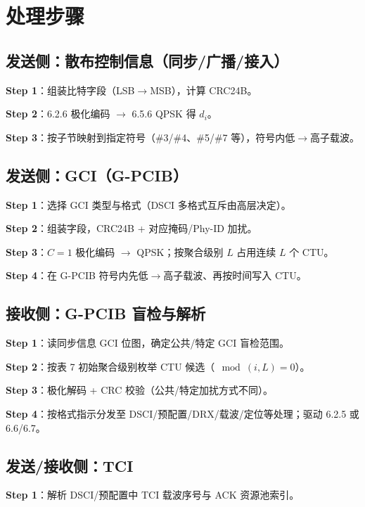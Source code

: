 \documentclass[11pt,a4paper]{ctexart}
\begin{document}
\section{处理步骤}

\subsection{发送侧：散布控制信息（同步/广播/接入）}

\textbf{Step 1}：组装比特字段（LSB$\rightarrow$MSB），计算 CRC24B。

\textbf{Step 2}：6.2.6 极化编码 $\rightarrow$ 6.5.6 QPSK 得 $d_i$。

\textbf{Step 3}：按子节映射到指定符号（\#3/\#4、\#5/\#7 等），符号内低$\rightarrow$高子载波。

\subsection{发送侧：GCI（G-PCIB）}

\textbf{Step 1}：选择 GCI 类型与格式（DSCI 多格式互斥由高层决定）。

\textbf{Step 2}：组装字段，CRC24B + 对应掩码/Phy-ID 加扰。

\textbf{Step 3}：$C{=}1$ 极化编码 $\rightarrow$ QPSK；按聚合级别 $L$ 占用连续 $L$ 个 CTU。

\textbf{Step 4}：在 G-PCIB 符号内先低$\rightarrow$高子载波、再按时间写入 CTU。

\subsection{接收侧：G-PCIB 盲检与解析}

\textbf{Step 1}：读同步信息 GCI 位图，确定公共/特定 GCI 盲检范围。

\textbf{Step 2}：按表 7 初始聚合级别枚举 CTU 候选（$\mod(i,L){=}0$）。

\textbf{Step 3}：极化解码 + CRC 校验（公共/特定加扰方式不同）。

\textbf{Step 4}：按格式指示分发至 DSCI/预配置/DRX/载波/定位等处理；驱动 6.2.5 或 6.6/6.7。

\subsection{发送/接收侧：TCI}

\textbf{Step 1}：解析 DSCI/预配置中 TCI 载波序号与 ACK 资源池索引。
\end{document}
